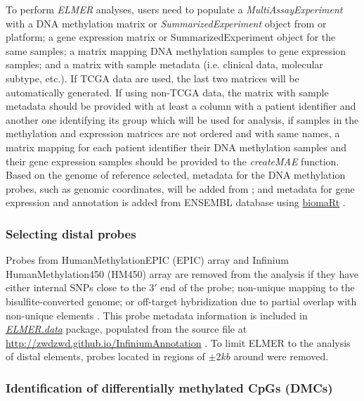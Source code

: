To perform \textit{ELMER} analyses, users need to populate a \textit{MultiAssayExperiment}
with a DNA methylation matrix or \textit{SummarizedExperiment} object from
 or  platform;
 a gene expression matrix or SummarizedExperiment object for the same samples;
 a matrix mapping DNA methylation samples to gene expression samples; and a matrix with sample metadata (i.e. clinical data, molecular subtype, etc.). If TCGA data are used, the last two matrices will be automatically generated.
If using non-TCGA data, the matrix with sample metadata should be provided with at least a column with a patient identifier and another one identifying its group which will be used for analysis, if samples in the methylation and expression matrices are not ordered and with same names, a matrix mapping for each patient identifier their DNA methylation samples and their gene expression samples should be provided to the \textit{createMAE} function.
Based on the genome of reference selected, metadata for the DNA methylation probes, such as genomic coordinates, will be added from   \href{http://zwdzwd.github.io/InfiniumAnnotation}{};
and metadata for gene expression and annotation is added from ENSEMBL database \cite{yates2015ensembl} using \href{http://bioconductor.org/packages/biomaRt/}{biomaRt}
\cite{durinck2009mapping}.

\subsubsection{Selecting distal probes}
Probes from HumanMethylationEPIC (EPIC) array and Infinium HumanMethylation450 (HM450)
array are removed from the analysis if they have either internal SNPs close to the $3'$
end of the probe; non-unique mapping to the bisulfite-converted genome;
or off-target hybridization due to partial overlap with non-unique elements \cite{doi:10.1093/nar/gkw967}.
This probe metadata information is
included in \href{https://github.com/tiagochst/ELMER.data}{\textit{ELMER.data}} package,
populated from the source file at \url{http://zwdzwd.github.io/InfiniumAnnotation}
\cite{doi:10.1093/nar/gkw967}.
To limit ELMER to the analysis of distal elements, probes located in regions of $\pm2 kb$
around  were removed.

\subsubsection{Identification of differentially methylated CpGs (DMCs)}


